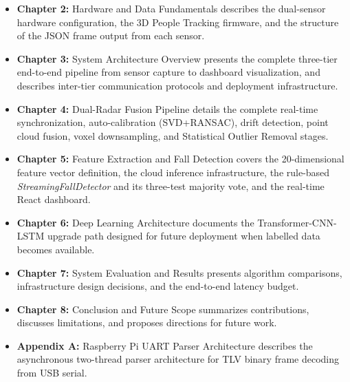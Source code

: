 \begin{itemize}
    \item \textbf{Chapter 2:} Hardware and Data Fundamentals describes the dual-sensor hardware configuration, the 3D People Tracking firmware, and the structure of the JSON frame output from each sensor.

    \item \textbf{Chapter 3:} System Architecture Overview presents the complete three-tier end-to-end pipeline from sensor capture to dashboard visualization, and describes inter-tier communication protocols and deployment infrastructure.

    \item \textbf{Chapter 4:} Dual-Radar Fusion Pipeline details the complete real-time synchronization, auto-calibration (SVD+RANSAC), drift detection, point cloud fusion, voxel downsampling, and Statistical Outlier Removal stages.

    \item \textbf{Chapter 5:} Feature Extraction and Fall Detection covers the 20-dimensional feature vector definition, the cloud inference infrastructure, the rule-based \textit{StreamingFallDetector} and its three-test majority vote, and the real-time React dashboard.

    \item \textbf{Chapter 6:} Deep Learning Architecture documents the Transformer-CNN-LSTM upgrade path designed for future deployment when labelled data becomes available.

    \item \textbf{Chapter 7:} System Evaluation and Results presents algorithm comparisons, infrastructure design decisions, and the end-to-end latency budget.

    \item \textbf{Chapter 8:} Conclusion and Future Scope summarizes contributions, discusses limitations, and proposes directions for future work.

    \item \textbf{Appendix A:} Raspberry Pi UART Parser Architecture describes the asynchronous two-thread parser architecture for TLV binary frame decoding from USB serial.
\end{itemize}